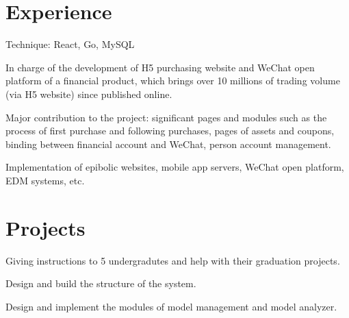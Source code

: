 \documentclass[]{resume_en}
\begin{document}
\begin{minipage}[t]{0.66\textwidth} 


\section{Experience}
\vspace{\topsep}
\begin{tightemize}
\item Technique: React, Go, MySQL
\item In charge of the development of H5 purchasing website and WeChat open platform of a financial product, which brings over 10 millions of trading volume (via H5 website) since published online.
\item Major contribution to the project: significant pages and modules such as the process of first purchase and following purchases, pages of assets and coupons, binding between financial account and WeChat, person account management.
\end{tightemize}
\shortsectionsep

\begin{tightemize}
\item Implementation of epibolic websites, mobile app servers, WeChat open platform, EDM systems, etc.
\end{tightemize}


\section{Projects}
\begin{tightemize}
\item Giving instructions to 5 undergradutes and help with their graduation projects.
\item Design and build the structure of the system.
\item Design and implement the modules of model management and model analyzer.
\end{tightemize}
\shortsectionsep


\end{minipage}
\end{document}
